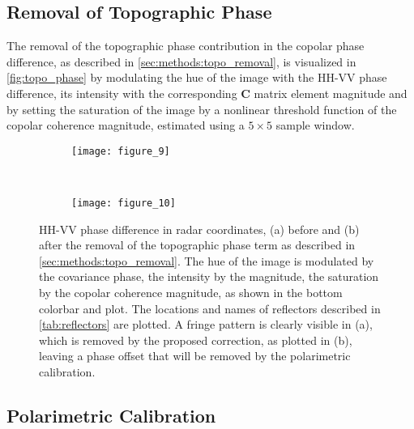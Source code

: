 \subsection{Removal of Topographic Phase}\label{sec:results:topo_removal}
The removal of the topographic phase contribution in the copolar phase difference, as described in \autoref{sec:methods:topo_removal}, is visualized in  \autoref{fig:topo_phase} by modulating the hue of the image with the HH-VV phase difference, its intensity with the corresponding $\mathbf{C}$ matrix element magnitude and by setting the saturation of the image by a nonlinear threshold function of the copolar coherence magnitude, estimated using a $\mathrm{5 \times 5}$ sample window. 
\begin{figure*}[hb]
	\centering
	\begin{subfigure}[t]{0.5\textwidth}
	\centering
	\texttt{[image: figure\_9]}
	\label{fig:topo_phase:uncorrected}
	\end{subfigure}~
	\begin{subfigure}[t]{0.5\textwidth}
	\centering
	\texttt{[image: figure\_10]}
	\label{fig:topo_phase:corrected}
	\end{subfigure}
	\caption{HH-VV phase difference in radar coordinates, (a) before and (b)  after the removal of the topographic phase term as described in \autoref{sec:methods:topo_removal}. The hue of the image is modulated by the covariance phase, the intensity by the magnitude, the saturation by the copolar coherence magnitude, as shown in the bottom colorbar and plot. The locations and names of reflectors described in \autoref{tab:reflectors} are plotted. A fringe pattern is clearly visible in (a), which is removed by the proposed correction, as plotted in (b), leaving a phase offset that will be removed by the polarimetric calibration.}
	\label{fig:topo_phase}
\end{figure*}
\subsection{Polarimetric Calibration}\label{sec:results:proc_polcal}

